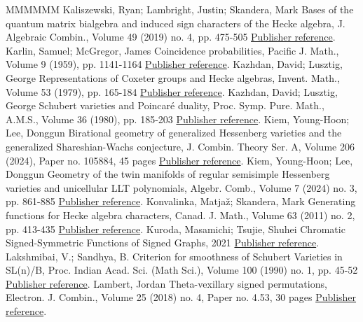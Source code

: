 \documentclass[11pt]{article}
\theoremstyle{definition}
\numberwithin{equation}{section}
\begin{document}
\begin{thebibliography}{MMMMMM}
 Kaliszewski, Ryan; Lambright, Justin; Skandera, Mark Bases of the quantum matrix bialgebra and induced sign characters of the Hecke algebra, J. Algebraic Combin., Volume 49 (2019) no. 4, pp. 475-505 \href{https://alco.centre-mersenne.org/articles/10.5802/alco.459/#KLSBasesQMBIndSgn}{Publisher reference}.
 Karlin, Samuel; McGregor, James Coincidence probabilities, Pacific J. Math., Volume 9 (1959), pp. 1141-1164 \href{https://alco.centre-mersenne.org/articles/10.5802/alco.459/#KMG}{Publisher reference}.
 Kazhdan, David; Lusztig, George Representations of Coxeter groups and Hecke algebras, Invent. Math., Volume 53 (1979), pp. 165-184 \href{https://alco.centre-mersenne.org/articles/10.5802/alco.459/#KLRepCH}{Publisher reference}.
 Kazhdan, David; Lusztig, George Schubert varieties and Poincaré duality, Proc. Symp. Pure. Math., A.M.S., Volume 36 (1980), pp. 185-203 \href{https://alco.centre-mersenne.org/articles/10.5802/alco.459/#KLSchub}{Publisher reference}.
 Kiem, Young-Hoon; Lee, Donggun Birational geometry of generalized Hessenberg varieties and the generalized Shareshian-Wachs conjecture, J. Combin. Theory Ser. A, Volume 206 (2024), Paper no. 105884, 45 pages \href{https://alco.centre-mersenne.org/articles/10.5802/alco.459/#KiemLeeBirational}{Publisher reference}.
 Kiem, Young-Hoon; Lee, Donggun Geometry of the twin manifolds of regular semisimple Hessenberg varieties and unicellular LLT polynomials, Algebr. Comb., Volume 7 (2024) no. 3, pp. 861-885 \href{https://alco.centre-mersenne.org/articles/10.5802/alco.459/#KiemLeeTwin}{Publisher reference}.
 Konvalinka, Matjaž; Skandera, Mark Generating functions for Hecke algebra characters, Canad. J. Math., Volume 63 (2011) no. 2, pp. 413-435 \href{https://alco.centre-mersenne.org/articles/10.5802/alco.459/#KSkanQGJ}{Publisher reference}.
 Kuroda, Masamichi; Tsujie, Shuhei Chromatic Signed-Symmetric Functions of Signed Graphs, 2021 \href{https://alco.centre-mersenne.org/articles/10.5802/alco.459/#KurTsuChrom}{Publisher reference}.
 Lakshmibai, V.; Sandhya, B. Criterion for smoothness of Schubert Varieties in SL(n)/B, Proc. Indian Acad. Sci. (Math Sci.), Volume 100 (1990) no. 1, pp. 45-52 \href{https://alco.centre-mersenne.org/articles/10.5802/alco.459/#LakSan}{Publisher reference}.
 Lambert, Jordan Theta-vexillary signed permutations, Electron. J. Combin., Volume 25 (2018) no. 4, Paper no. 4.53, 30 pages \href{https://alco.centre-mersenne.org/articles/10.5802/alco.459/#LambertTheta}{Publisher reference}.

\end{thebibliography}
\end{document}
